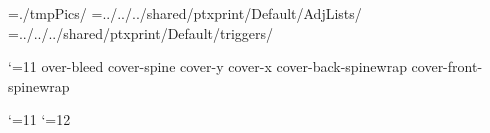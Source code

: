 \def\RHoddleft{\empty}
\def\RHoddcenter{\pagenumber}
\def\RHoddright{\rangeref}

\def\RHnoVevenleft{\empty}
\def\RHnoVevencenter{\pagenumber}
\def\RHnoVevenright{\empty}

\def\RHnoVoddleft{\empty}
\def\RHnoVoddcenter{\pagenumber}
\def\RHnoVoddright{\empty}

\VerseRefsfalse               %
\OmitChapterNumberRHfalse   %
\OmitBookReffalse              %

\def\RFoddcenter{\empty}
\def\RFevencenter{\empty}
\def\RFtitleevencenter{\pagenumberR}
\def\RFtitleoddcenter{\pagenumberR}
\def\RFnoVoddcenter{\empty}
\def\RFnoVevencenter{\empty}

\PBOnBodyfalse


\IncludeFiguresfalse
\SkipMissingFigtrue
\DoCaptionstrue
\FigurePlaceholdersfalse
\PicPath={./tmpPics/}
\AdjListPath={../../../shared/ptxprint/Default/AdjLists/}
\TrigListPath={../../../shared/ptxprint/Default/triggers/}
\NoTransparencytrue

\catcode`\@=11
\def\tmp{5mm}   %
\expandafter\edef\csname cover-bleed\endcsname{5mm}   %
\expandafter\edef\csname cover-spine\endcsname{0mm}   %
\expandafter\xdef\csname cover-y\endcsname{\the\PaperHeight} %
\expandafter\xdef\csname cover-x\endcsname{\the\PaperWidth} %
\expandafter\edef\csname cover-back-spinewrap\endcsname{0mm} %
\expandafter\edef\csname cover-front-spinewrap\endcsname{0mm} %

\def\b{\the\p@rstylehooks \par\bgroup\s@tbaseline{b}\vskip\baselineskip\egroup}
\newlanguage\langund \language\langund
\catcode`\@=11
 
\catcode`\@=12
\let\pb=\pagebreak

